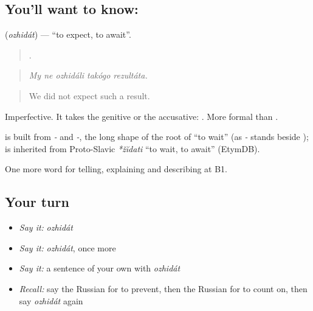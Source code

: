 \subsection*{You'll want to know: }
\textbf{} (\emph{ozhidát}) — \textquotedblleft{}to expect, to await\textquotedblright{}.

\begin{quote}
    .
\end{quote}

\begin{quote}
\emph{My ne ozhidáli takógo rezultáta.}
\end{quote}

\begin{quote}
We did not expect such a result.
\end{quote}

Imperfective. It takes the genitive or the accusative: \emph{ }. More formal than \emph{}.

\begin{cousinweb}
\textbf{} is built from \emph{-} and \emph{-}, the long shape of the root of \emph{} \textquotedblleft{}to wait\textquotedblright{} (as \emph{-} stands beside \emph{}); \emph{} is inherited from Proto-Slavic \emph{*žĭdati} \textquotedblleft{}to wait, to await\textquotedblright{} (EtymDB).
\end{cousinweb}

\begin{grammarlens}[title={What you've built}]
One more word for telling, explaining and describing at B1.
\end{grammarlens}

\subsection*{Your turn}
\begin{itemize}
\raggedright
  \item \emph{Say it:} \emph{ozhidát}
  \item \emph{Say it:} \emph{ozhidát}, once more
  \item \emph{Say it:} a sentence of your own with \emph{ozhidát}
  \item \emph{Recall:} say the Russian for to prevent, then the Russian for to count on, then say \emph{ozhidát} again
\end{itemize}

